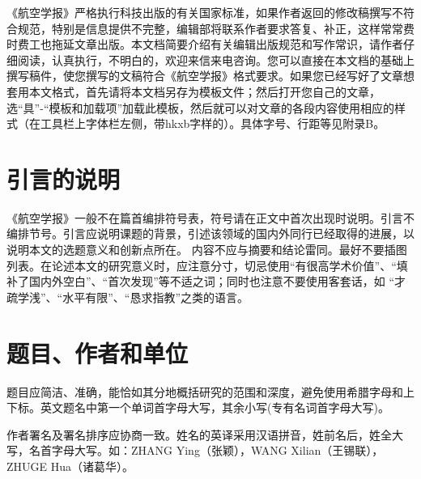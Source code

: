 \documentclass[10.5pt,twocolumn]{aaas}
\begin{document}
\wuhao


《航空学报》\enlargethispage{-3.0cm}严格执行科技出版的有关国家标准，如果作者返回的修改稿撰写不符合规范，特别是信息提供不完整，编辑部将联系作者要求答复、补正，这样常常费时费工也拖延文章出版。本文档简要介绍有关编辑出版规范和写作常识，请作者仔细阅读，认真执行，不明白的，欢迎来信来电咨询。您可以直接在本文档的基础上撰写稿件，使您撰写的文稿符合《航空学报》格式要求。如果您已经写好了文章想套用本文格式，首先请将本文档另存为模板文件；然后打开您自己的文章，选“具”-“模板和加载项”加载此模板，然后就可以对文章的各段内容使用相应的样式（在工具栏上字体栏左侧，带hkxb字样的）。具体字号、行距等见附录B。\enlargethispage{-3.0cm}

\section{引言的说明}
《航空学报》一般不在篇首编排符号表，符号请在正文中首次出现时说明。引言不编排节号。引言应说明课题的背景，引述该领域的国内外同行已经取得的进展，以说明本文的选题意义和创新点所在。 内容不应与摘要和结论雷同。最好不要插图列表。在论述本文的研究意义时，应注意分寸，切忌使用“有很高学术价值”、“填补了国内外空白”、“首次发现”等不适之词；同时也注意不要使用客套话，如 “才疏学浅”、“水平有限”、“恳求指教”之类的语言。

\section{题目、作者和单位}

题目应简洁、准确，能恰如其分地概括研究的范围和深度，避免使用希腊字母和上下标。英文题名中第一个单词首字母大写，其余小写(专有名词首字母大写)。

作者署名及署名排序应协商一致。姓名的英译采用汉语拼音，姓前名后，姓全大写，名首字母大写。如：ZHANG Ying（张颖），WANG Xilian（王锡联），ZHUGE Hua（诸葛华）。
\end{document}
